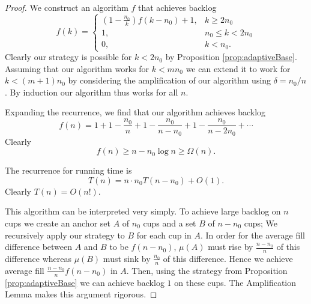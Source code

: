 \documentclass[twocolumn]{article}[10pt]
\begin{document}
\begin{proof}
  We construct an algorithm $f$ that achieves backlog 
  $$f(k) = \begin{cases}
    \left(1-\frac{n_0}{k}\right)f(k-n_0) + 1, &k \ge 2n_0\\
    1,  &n_0\le k < 2n_0 \\
    0, &k< n_0.
  \end{cases}$$
  Clearly our strategy is possible for $k<2n_0$ by Proposition
  \ref{prop:adaptiveBase}.
  Assuming that our algorithm works for $k<mn_0$ we can extend it to work for
  $k<(m+1)n_0$ by considering the amplification of our algorithm using $\delta = n_0/n$.
  By induction our algorithm thus works for all $n$.

  Expanding the recurrence, we find that our algorithm achieves backlog 
  $$f(n) = 1+ 1-\frac{n_0}{n} + 1-\frac{n_0}{n-n_0} + 1-\frac{n_0}{n-2n_0} + \cdots $$
  Clearly 
  $$f(n) \ge n - n_0 \log n \ge \Omega(n).$$

  The recurrence for running time is 
  $$T(n) = n \cdot n_0T(n-n_0)+O(1).$$
  Clearly $T(n) = O(n!)$.

  This algorithm can be interpreted very simply. To achieve large backlog on
  $n$ cups we create an anchor set $A$ of $n_0$ cups and a set $B$ of $n-n_0$
  cups; We recursively apply our strategy to $B$ for each cup in $A$. In
  order for the average fill difference between $A$ and $B$ to be $f(n-n_0)$,
  $\mu(A)$ must rise by $\frac{n-n_0}{n}$ of this difference whereas $\mu(B)$
  must sink by $\frac{n_0}{n}$ of this difference. Hence we achieve average
  fill $\frac{n-n_0}{n}f(n-n_0)$ in $A$. Then, using the strategy from
  Proposition \ref{prop:adaptiveBase} we can achieve backlog $1$ on these
  cups. The Amplification Lemma makes this argument rigorous.


\end{proof}
\end{document}
